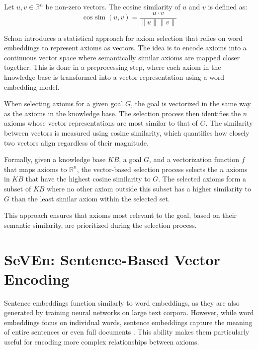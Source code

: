 \documentclass[english,version-2020-11]{uzl-thesis}
\begin{document}
\begin{definition}
    Let \( u, v \in \mathbb{R}^n \) be non-zero vectors. The cosine similarity of \( u \) and \( v \) is defined as:
    \begin{equation}
        \operatorname{cos\ sim}(u, v) = \frac{u \cdot v}{\|u\| \|v\|}
    \end{equation}
\end{definition}

Schon \cite{Schon2023} introduces a statistical approach for axiom selection that relies on word embeddings to represent axioms as vectors. The idea is to encode axioms into a continuous vector space where semantically similar axioms are mapped closer together. This is done in a preprocessing step, where each axiom in the knowledge base is transformed into a vector representation using a word embedding model.

When selecting axioms for a given goal \( G \), the goal is vectorized in the same way as the axioms in the knowledge base. The selection process then identifies the \( n \) axioms whose vector representations are most similar to that of \( G \). The similarity between vectors is measured using cosine similarity, which quantifies how closely two vectors align regardless of their magnitude.

Formally, given a knowledge base \( KB \), a goal \( G \), and a vectorization function \( f \) that maps axioms to \( \mathbb{R}^n \), the vector-based selection process selects the \( n \) axioms in \( KB \) that have the highest cosine similarity to \( G \). The selected axioms form a subset of \( KB \) where no other axiom outside this subset has a higher similarity to \( G \) than the least similar axiom within the selected set.

This approach ensures that axioms most relevant to the goal, based on their semantic similarity, are prioritized during the selection process.

\section{SeVEn: Sentence-Based Vector Encoding}

Sentence embeddings function similarly to word embeddings, as they are also generated by training neural networks on large text corpora. However, while word embeddings focus on individual words, sentence embeddings capture the meaning of entire sentences or even full documents \cite{Kiros2015SkipThought}. This ability makes them particularly useful for encoding more complex relationships between axioms.
\end{document}
